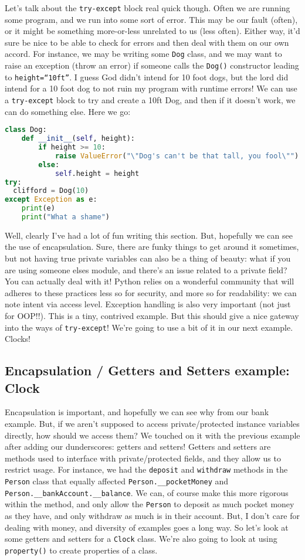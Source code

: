 \documentclass[12pt, twoside, reqno]{book}
\begin{document}
Let's talk about the \texttt{try-except} block real quick though. Often we are running some program, and we run into some sort of error. This may be our fault (often), or it might be something more-or-less unrelated to us (less often). Either way, it'd sure be nice to be able to check for errors and then deal with them on our own accord. For instance, we may be writing some \texttt{Dog} class, and we may want to raise an exception (throw an error) if someone calls the \texttt{Dog()} constructor leading to \texttt{height=``10ft''}. I guess God didn't intend for 10 foot dogs, but the lord did intend for a 10 foot dog to not ruin my program with runtime errors! We can use a \texttt{try-except} block to try and create a 10ft Dog, and then if it doesn't work, we can do something else. Here we go:
\begin{lstlisting}[language=Python]
class Dog:
    def __init__(self, height):
        if height >= 10:
            raise ValueError("\"Dog's can't be that tall, you fool\"")
        else:
            self.height = height
try:
  clifford = Dog(10)
except Exception as e:
    print(e)
    print("What a shame")
\end{lstlisting}

Well, clearly I've had a lot of fun writing this section. But, hopefully we can see the use of encapsulation. Sure, there are funky things to get around it sometimes, but not having true private variables can also be a thing of beauty: what if you are using someone elses module, and there's an issue related to a private field? You can actually deal with it! Python relies on a wonderful community that will adheres to these practices less so for security, and more so for readability: we can note intent via access level. Exception handling is also very important (not just for OOP!!). This is a tiny, contrived example. But this should give a nice gateway into the ways of \texttt{try-except}! We're going to use a bit of it in our next example. Clocks!

\subsection{Encapsulation / Getters and Setters example: Clock}

Encapsulation is important, and hopefully we can see why from our bank example. But, if we aren't supposed to access private/protected instance variables directly, how should we access them? We touched on it with the previous example after adding our dunderscores: getters and setters! Getters and setters are methods used to interface with private/protected fields, and they allow us to restrict usage. For instance, we had the \texttt{deposit} and \texttt{withdraw} methods in the \texttt{Person} class that equally affected \texttt{Person.\_\_pocketMoney} and \texttt{Person.\_\_bankAccount.\_\_balance}. We can, of course make this more rigorous within the method, and only allow the \texttt{Person} to deposit as much pocket money as they have, and only withdraw as much is in their account. But, I don't care for dealing with money, and diversity of examples goes a long way. So let's look at some getters and setters for a \texttt{Clock} class. We're also going to look at using \texttt{property()} to create properties of a class.
\end{document}
